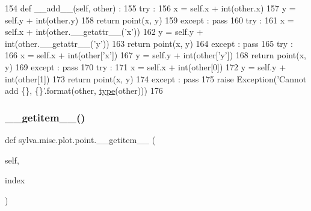 \begin{DoxyCode}
154     \textcolor{keyword}{def }\_\_add\_\_(self, other) :
155       \textcolor{keywordflow}{try} :
156         x = self.x + int(other.x)
157         y = self.y + int(other.y)
158         \textcolor{keywordflow}{return} point(x, y)
159       \textcolor{keywordflow}{except} : \textcolor{keywordflow}{pass}
160       \textcolor{keywordflow}{try} :
161         x = self.x + int(other.\_\_getattr\_\_(\textcolor{stringliteral}{'x'}))
162         y = self.y + int(other.\_\_getattr\_\_(\textcolor{stringliteral}{'y'}))
163         \textcolor{keywordflow}{return} point(x, y)
164       \textcolor{keywordflow}{except} : \textcolor{keywordflow}{pass}
165       \textcolor{keywordflow}{try} :
166         x = self.x + int(other[\textcolor{stringliteral}{'x'}])
167         y = self.y + int(other[\textcolor{stringliteral}{'y'}])
168         \textcolor{keywordflow}{return} point(x, y)
169       \textcolor{keywordflow}{except} : \textcolor{keywordflow}{pass}
170       \textcolor{keywordflow}{try} :
171         x = self.x + int(other[0])
172         y = self.y + int(other[1])
173         \textcolor{keywordflow}{return} point(x, y)
174       \textcolor{keywordflow}{except} : \textcolor{keywordflow}{pass}
175       \textcolor{keywordflow}{raise} Exception(\textcolor{stringliteral}{'Cannot add \{\}, \{\}'}.format(other, \hyperlink{namespacesylva_1_1misc_1_1exec_a55d55e6d0e68715dfbd883034bd7290c}{type}(other)))
176 
\end{DoxyCode}
\mbox{\label{classsylva_1_1misc_1_1plot_1_1point_a38c8a33b3548844e6aa0be06d639dc5f}} 
\subsubsection{\texorpdfstring{\+\_\+\+\_\+getitem\+\_\+\+\_\+()}{\_\_getitem\_\_()}}
{\footnotesize\ttfamily def sylva.\+misc.\+plot.\+point.\+\_\+\+\_\+getitem\+\_\+\+\_\+ (\begin{DoxyParamCaption}\item[{}]{self,  }\item[{}]{index }\end{DoxyParamCaption})}



